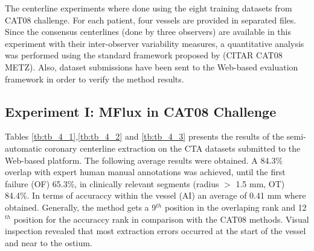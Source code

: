 The centerline experiments where done using the eight training datasets from CAT08 challenge. For each patient, four vessels are provided in separated files. Since the consensus centerlines (done by three observers) are available in this experiment with their inter-observer variability measures, a quantitative analysis was performed using the standard framework proposed by (CITAR CAT08 METZ). Also, dataset submissions have been sent to the Web-based evaluation framework in order to verify the method results.

\subsection{Experiment I: MFlux in CAT08 Challenge}

Tables \ref{tb:tb_4_1},\ref{tb:tb_4_2} and \ref{tb:tb_4_3}  presents the results of the semi-automatic coronary centerline extraction on the CTA datasets submitted to the Web-based platform. The following average results were obtained. A 84.3\% overlap with expert human manual annotations was achieved, until the first failure (OF) 65.3\%, in clinically relevant segments (radius $>$ 1.5 mm, OT) 84.4\%. In terms of accuraccy within the vessel (AI) an average of 0.41 mm where obtained. Generally, the method gets a 9$^{th}$ position in the overlaping rank and 12$^{th}$ position for the accuraccy rank in comparison with the CAT08 methods. Visual inspection revealed that most extraction errors occurred at the start of the vessel and near to the ostium. 

